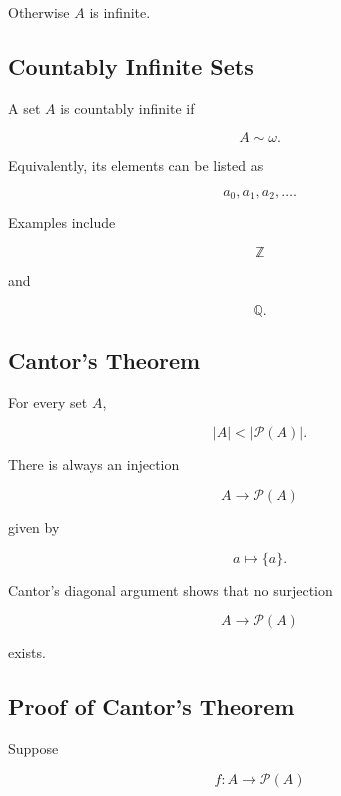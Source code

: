 Otherwise \(A\) is infinite.

\subsection{Countably Infinite Sets}
\label{subsec:countably-infinite-axiomatic}

A set \(A\) is countably infinite if

\[
\boxed{
A\sim\omega.
}
\]

Equivalently, its elements can be listed as

\[
\boxed{
a_0,a_1,a_2,\ldots.
}
\]

Examples include

\[
\boxed{
\mathbb{Z}
}
\]

and

\[
\boxed{
\mathbb{Q}.
}
\]

\subsection{Cantor's Theorem}
\label{subsec:cantors-theorem-set-theory}

\begin{theorem}
For every set \(A\),

\[
\boxed{
|A|
<
|\mathcal{P}(A)|.
}
\]
\end{theorem}

There is always an injection

\[
A
\to
\mathcal{P}(A)
\]

given by

\[
a\mapsto\{a\}.
\]

Cantor's diagonal argument shows that no surjection

\[
A\to\mathcal{P}(A)
\]

exists.

\subsection{Proof of Cantor's Theorem}
\label{subsec:proof-cantor-theorem}

Suppose

\[
f:A\to\mathcal{P}(A)
\]

